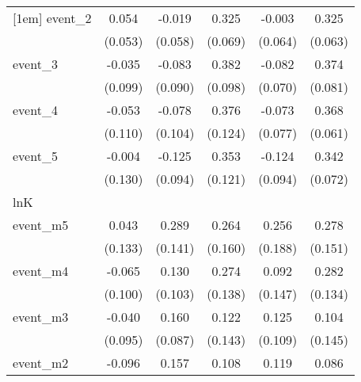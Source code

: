 {\begin{tabular}{l*{5}{c}}
[1em]
event\_2     &       0.054         &      -0.019         &       0.325\sym{***}&      -0.003         &       0.325\sym{***}\\
            &     (0.053)         &     (0.058)         &     (0.069)         &     (0.064)         &     (0.063)         \\
[1em]
event\_3     &      -0.035         &      -0.083         &       0.382\sym{***}&      -0.082         &       0.374\sym{***}\\
            &     (0.099)         &     (0.090)         &     (0.098)         &     (0.070)         &     (0.081)         \\
[1em]
event\_4     &      -0.053         &      -0.078         &       0.376\sym{**} &      -0.073         &       0.368\sym{***}\\
            &     (0.110)         &     (0.104)         &     (0.124)         &     (0.077)         &     (0.061)         \\
[1em]
event\_5     &      -0.004         &      -0.125         &       0.353\sym{**} &      -0.124         &       0.342\sym{***}\\
            &     (0.130)         &     (0.094)         &     (0.121)         &     (0.094)         &     (0.072)         \\
\hline
lnK         &                     &                     &                     &                     &                     \\
event\_m5    &       0.043         &       0.289\sym{*}  &       0.264         &       0.256         &       0.278         \\
            &     (0.133)         &     (0.141)         &     (0.160)         &     (0.188)         &     (0.151)         \\
[1em]
event\_m4    &      -0.065         &       0.130         &       0.274\sym{*}  &       0.092         &       0.282\sym{*}  \\
            &     (0.100)         &     (0.103)         &     (0.138)         &     (0.147)         &     (0.134)         \\
[1em]
event\_m3    &      -0.040         &       0.160         &       0.122         &       0.125         &       0.104         \\
            &     (0.095)         &     (0.087)         &     (0.143)         &     (0.109)         &     (0.145)         \\
[1em]
event\_m2    &      -0.096         &       0.157\sym{**} &       0.108         &       0.119         &       0.086         \\

\end{tabular}}
